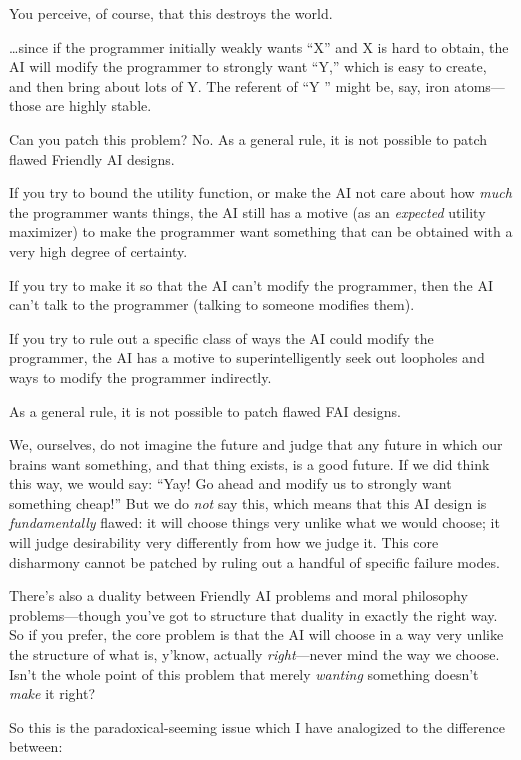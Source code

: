 {
 You perceive, of course, that this destroys the world.}

{
 \ldots since if the programmer initially weakly wants
``X'' and X is hard to obtain, the
AI will modify the programmer to strongly want
``Y,'' which is easy to create, and
then bring about lots of Y. The referent of ``Y
'' might be, say, iron atoms---those are highly
stable.}

{
 Can you patch this problem? No. As a general rule, it is not
possible to patch flawed Friendly AI designs.}

{
 If you try to bound the utility function, or make the AI not care
about how \textit{much} the programmer wants things, the AI still has a
motive (as an \textit{expected} utility maximizer) to make the
programmer want something that can be obtained with a very high degree
of certainty.}

{
 If you try to make it so that the AI can't modify
the programmer, then the AI can't talk to the
programmer (talking to someone modifies them).}

{
 If you try to rule out a specific class of ways the AI could
modify the programmer, the AI has a motive to superintelligently seek
out loopholes and ways to modify the programmer indirectly.}

{
 As a general rule, it is not possible to patch flawed FAI
designs.}

{
 We, ourselves, do not imagine the future and judge that any future
in which our brains want something, and that thing exists, is a good
future. If we did think this way, we would say: ``Yay!
Go ahead and modify us to strongly want something
cheap!'' But we do \textit{not} say this, which means
that this AI design is \textit{fundamentally} flawed: it will choose
things very unlike what we would choose; it will judge desirability
very differently from how we judge it. This core disharmony cannot be
patched by ruling out a handful of specific failure modes.}

{
 There's also a duality between Friendly AI
problems and moral philosophy problems---though you've
got to structure that duality in exactly the right way. So if you
prefer, the core problem is that the AI will choose in a way very
unlike the structure of what is, y'know, actually
\textit{right}{}---never mind the way we choose. Isn't
the whole point of this problem that merely \textit{wanting} something
doesn't \textit{make} it right?}

{
 So this is the paradoxical-seeming issue which I have analogized
to the difference between:}

